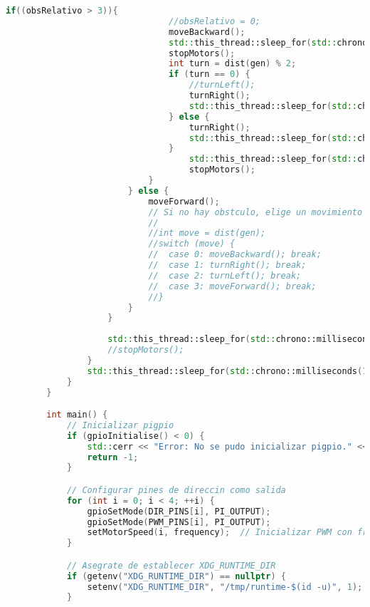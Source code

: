 \begin{lstlisting}[language={C++}, caption={Primera versi\'on del c\'odigo del sistema de control del robot}, label={Script}]
                            if((obsRelativo > 3)){
                                //obsRelativo = 0;
                                moveBackward();
                                std::this_thread::sleep_for(std::chrono::seconds(3));
                                stopMotors();
                                int turn = dist(gen) % 2;
                                if (turn == 0) {
                                    //turnLeft();
                                    turnRight();
                                    std::this_thread::sleep_for(std::chrono::seconds(5));
                                } else {
                                    turnRight();
                                    std::this_thread::sleep_for(std::chrono::seconds(5));
                                }
                                    std::this_thread::sleep_for(std::chrono::seconds(2));
                                    stopMotors();
                            }
                        } else {
                            moveForward();
                            // Si no hay obstculo, elige un movimiento aleatorio
                            //
                            //int move = dist(gen);
                            //switch (move) {
                            //  case 0: moveBackward(); break;
                            //  case 1: turnRight(); break;
                            //  case 2: turnLeft(); break;
                            //  case 3: moveForward(); break;
                            //}
                        }
                    }
                    
                    std::this_thread::sleep_for(std::chrono::milliseconds(500));
                    //stopMotors();
                }
                std::this_thread::sleep_for(std::chrono::milliseconds(100));
            }
        }

        int main() {
            // Inicializar pigpio
            if (gpioInitialise() < 0) {
                std::cerr << "Error: No se pudo inicializar pigpio." << std::endl;
                return -1;
            }

            // Configurar pines de direccin como salida
            for (int i = 0; i < 4; ++i) {
                gpioSetMode(DIR_PINS[i], PI_OUTPUT);
                gpioSetMode(PWM_PINS[i], PI_OUTPUT);
                setMotorSpeed(i, frequency);  // Inicializar PWM con frecuencia inicial
            }

            // Asegrate de establecer XDG_RUNTIME_DIR
            if (getenv("XDG_RUNTIME_DIR") == nullptr) {
                setenv("XDG_RUNTIME_DIR", "/tmp/runtime-$(id -u)", 1);
            }


\end{lstlisting}
